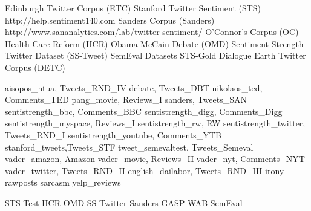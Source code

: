 Edinburgh Twitter Corpus (ETC)
Stanford Twitter Sentiment (STS) http://help.sentiment140.com
Sanders Corpus (Sanders) http://www.sananalytics.com/lab/twitter-sentiment/
O’Connor’s Corpus (OC)
Health Care Reform (HCR)
Obama-McCain Debate (OMD)
Sentiment Strength Twitter Dataset (SS-Tweet)
SemEval Datasets
STS-Gold
Dialogue Earth Twitter Corpus (DETC)

aisopos_ntua, Tweets_RND_IV
debate, Tweets_DBT
nikolaos_ted, Comments_TED
pang_movie, Reviews_I
sanders, Tweets_SAN
sentistrength_bbc, Comments_BBC
sentistrength_digg, Comments_Digg
sentistrength_myspace, Reviews_I
sentistrength_rw, RW
sentistrength_twitter, Tweets_RND_I
sentistrength_youtube, Comments_YTB
stanford_tweets,Tweets_STF
tweet_semevaltest, Tweets_Semeval
vader_amazon, Amazon
vader_movie, Reviews_II
vader_nyt, Comments_NYT
vader_twitter, Tweets_RND_II
english_dailabor, Tweets_RND_III
irony
rawposts
sarcasm
yelp_reviews

STS-Test
HCR
OMD
SS-Twitter
Sanders
GASP
WAB
SemEval
